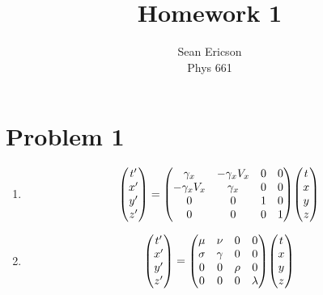 \documentclass[12pt]{article}
\begin{document}
\title{Homework 1}
\author{Sean Ericson \\ Phys 661}
\maketitle

\section*{Problem 1}
\begin{enumerate}[label=(\alph*)]
    \item 
        \[ 
            \mqty(t' \\ x' \\ y' \\ z') = 
            \mqty(
                \gamma_x & -\gamma_x V_x & 0 & 0 \\
                -\gamma_x V_x & \gamma_x & 0 & 0 \\
                0 & 0 & 1 & 0 \\
                0 & 0 & 0 & 1
            )
            \mqty(t \\ x \\ y \\ z)
        \]

    \item
        \[ 
            \mqty(t' \\ x' \\ y' \\ z') = 
            \mqty(
                \mu & \nu & 0 & 0 \\
                \sigma & \gamma & 0 & 0 \\
                0 & 0 & \rho & 0 \\
                0 & 0 & 0 & \lambda
            )
            \mqty(t \\ x \\ y \\ z)
        \]
\end{enumerate}
\end{document}
